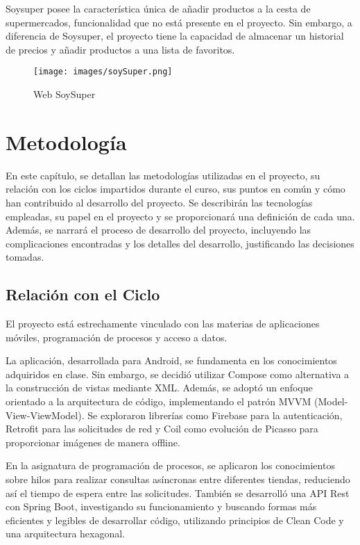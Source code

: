 \documentclass[12pt,twoside,titlepage]{report}
\begin{document}
Soysuper posee la característica única de añadir productos a la cesta de supermercados, funcionalidad que no está presente en el proyecto. Sin embargo, a diferencia de Soysuper, el proyecto tiene la capacidad de almacenar un historial de precios y añadir productos a una lista de favoritos.

\begin{figure}[H] %
    \centering
    \texttt{[image: images/soySuper.png]}
    \caption{Web SoySuper}
    \label{fig:soySuper}
\end{figure}


\chapter{Metodología}
\label{chap:contenidos}

En este capítulo, se detallan las metodologías utilizadas en el proyecto, su relación con los ciclos impartidos durante el curso, sus puntos en común y cómo han contribuido al desarrollo del proyecto. Se describirán las tecnologías empleadas, su papel en el proyecto y se proporcionará una definición de cada una. Además, se narrará el proceso de desarrollo del proyecto, incluyendo las complicaciones encontradas y los detalles del desarrollo, justificando las decisiones tomadas.

\section{Relación con el Ciclo}

El proyecto está estrechamente vinculado con las materias de aplicaciones móviles, programación de procesos y acceso a datos.

La aplicación, desarrollada para Android, se fundamenta en los conocimientos adquiridos en clase. Sin embargo, se decidió utilizar Compose como alternativa a la construcción de vistas mediante XML. Además, se adoptó un enfoque orientado a la arquitectura de código, implementando el patrón MVVM (Model-View-ViewModel). Se exploraron librerías como Firebase para la autenticación, Retrofit para las solicitudes de red y Coil como evolución de Picasso para proporcionar imágenes de manera offline.

En la asignatura de programación de procesos, se aplicaron los conocimientos sobre hilos para realizar consultas asíncronas entre diferentes tiendas, reduciendo así el tiempo de espera entre las solicitudes. También se desarrolló una API Rest con Spring Boot, investigando su funcionamiento y buscando formas más eficientes y legibles de desarrollar código, utilizando principios de Clean Code y una arquitectura hexagonal.
\end{document}
